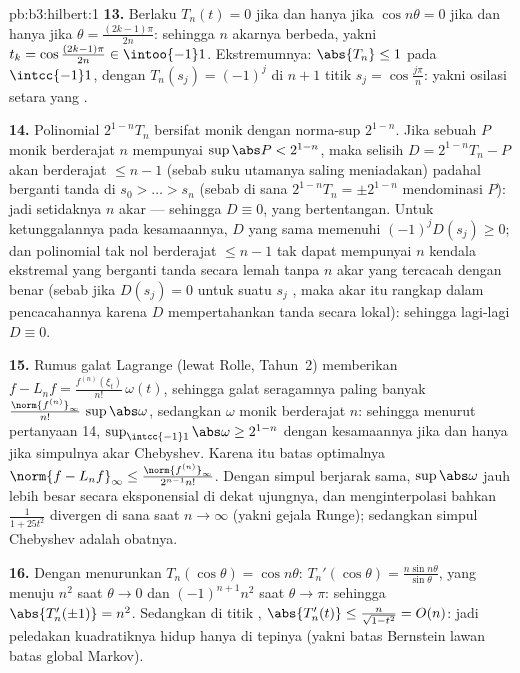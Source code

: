 \begin{solution}{pb:b3:hilbert:1}
\textbf{13.} Berlaku $T_n(t) = 0$ jika dan hanya jika $\cos n\theta = 0$ jika dan hanya jika
$\theta = \frac{(2k-1)\pi}{2n}$: sehingga $n$ akarnya berbeda, yakni
$t_k = \cos\frac{(2k-1)\pi}{2n} \in \intoo{-1}1$. Ekstremumnya:
$\abs{T_n} \leq 1$ pada $\intcc{-1}1$, dengan $T_n(s_j) =
(-1)^j$ di $n + 1$ titik $s_j = \cos\frac{j\pi}n$:
yakni osilasi setara yang .

\textbf{14.} Polinomial $2^{1-n}T_n$ bersifat monik dengan norma-sup $2^{1-n}$.
Jika sebuah $P$ monik berderajat $n$ mempunyai $\sup\abs P < 2^{1-n}$, maka
selisih $D = 2^{1-n}T_n - P$ akan berderajat $\leq n -
1$ (sebab suku utamanya saling meniadakan) padahal berganti tanda di $s_0 >
\dots > s_n$ (sebab di sana $2^{1-n}T_n = \pm2^{1-n}$ mendominasi
$P$): jadi setidaknya $n$ akar --- sehingga $D \equiv 0$, yang bertentangan.
Untuk ketunggalannya pada kesamaannya, $D$ yang sama memenuhi
$(-1)^jD(s_j) \geq 0$; dan polinomial tak nol berderajat $\leq
n-1$ tak dapat mempunyai $n$ kendala ekstremal yang berganti tanda
secara lemah tanpa $n$ akar yang tercacah dengan benar (sebab jika
$D(s_j) = 0$ untuk suatu $s_j$ , maka akar itu rangkap
dalam pencacahannya karena $D$ mempertahankan tanda secara lokal): sehingga lagi-lagi $D
\equiv 0$.

\textbf{15.} Rumus galat Lagrange (lewat Rolle, Tahun~2)
memberikan $f - L_nf = \frac{f^{(n)}(\xi_t)}{n!}\,\omega(t)$, sehingga
galat seragamnya paling banyak $\frac{\norm{f^{(n)}}_\infty}
{n!}\,\sup\abs\omega$, sedangkan $\omega$ monik berderajat $n$:
sehingga menurut pertanyaan 14, $\sup_{\intcc{-1}1}\abs\omega \geq 2^{1-n}$
dengan kesamaannya jika dan hanya jika simpulnya akar Chebyshev. Karena itu
batas optimalnya $\norm{f - L_nf}_\infty \leq
\frac{\norm{f^{(n)}}_\infty}{2^{n-1}n!}$. Dengan simpul berjarak
sama, $\sup\abs\omega$ jauh lebih besar secara eksponensial di dekat
ujungnya, dan menginterpolasi bahkan $\frac1{1 + 25t^2}$
divergen di sana saat $n \to \infty$ (yakni gejala Runge);
sedangkan simpul Chebyshev adalah obatnya.

\textbf{16.} Dengan menurunkan $T_n(\cos\theta) = \cos
n\theta$: $T_n'(\cos\theta) = \frac{n\sin n\theta}
{\sin\theta}$, yang menuju $n^2$ saat $\theta \to 0$ dan
$(-1)^{n+1}n^2$ saat $\theta \to \pi$: sehingga $\abs{T_n'(\pm1)} =
n^2$. Sedangkan di titik , $\abs{T_n'(t)} \leq
\frac{n}{\sqrt{1 - t^2}} = O(n)$: jadi peledakan kuadratiknya
hidup hanya di tepinya (yakni batas  Bernstein lawan
batas global Markov).


\end{solution}
